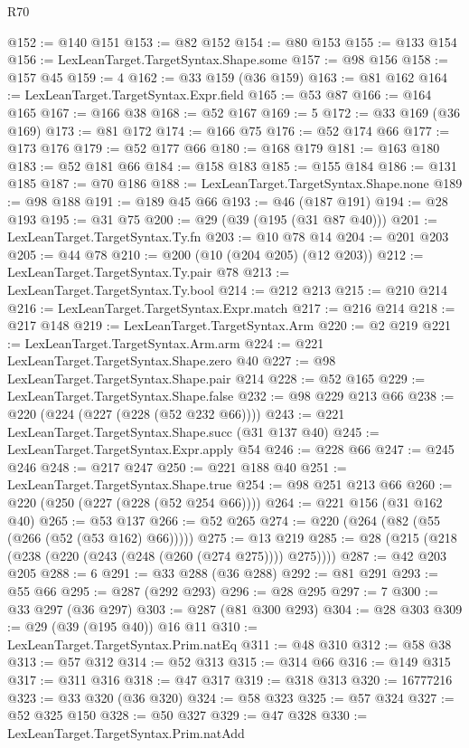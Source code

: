 \begin{lexlean}{R70}
\begin{coremodule}
@152 := @140 @151
@153 := @82 @152
@154 := @80 @153
@155 := @133 @154
@156 := LexLeanTarget.TargetSyntax.Shape.some
@157 := @98 @156
@158 := @157 @45
@159 := 4
@162 := @33 @159 (@36 @159)
@163 := @81 @162
@164 := LexLeanTarget.TargetSyntax.Expr.field
@165 := @53 @87
@166 := @164 @165
@167 := @166 @38
@168 := @52 @167
@169 := 5
@172 := @33 @169 (@36 @169)
@173 := @81 @172
@174 := @166 @75
@176 := @52 @174 @66
@177 := @173 @176
@179 := @52 @177 @66
@180 := @168 @179
@181 := @163 @180
@183 := @52 @181 @66
@184 := @158 @183
@185 := @155 @184
@186 := @131 @185
@187 := @70 @186
@188 := LexLeanTarget.TargetSyntax.Shape.none
@189 := @98 @188
@191 := @189 @45 @66
@193 := @46 (@187 @191)
@194 := @28 @193
@195 := @31 @75
@200 := @29 (@39 (@195 (@31 @87 @40)))
@201 := LexLeanTarget.TargetSyntax.Ty.fn
@203 := @10 @78 @14
@204 := @201 @203
@205 := @44 @78
@210 := @200 (@10 (@204 @205) (@12 @203))
@212 := LexLeanTarget.TargetSyntax.Ty.pair @78
@213 := LexLeanTarget.TargetSyntax.Ty.bool
@214 := @212 @213
@215 := @210 @214
@216 := LexLeanTarget.TargetSyntax.Expr.match
@217 := @216 @214
@218 := @217 @148
@219 := LexLeanTarget.TargetSyntax.Arm
@220 := @2 @219
@221 := LexLeanTarget.TargetSyntax.Arm.arm
@224 := @221 LexLeanTarget.TargetSyntax.Shape.zero @40
@227 := @98 LexLeanTarget.TargetSyntax.Shape.pair @214
@228 := @52 @165
@229 := LexLeanTarget.TargetSyntax.Shape.false
@232 := @98 @229 @213 @66
@238 := @220 (@224 (@227 (@228 (@52 @232 @66))))
@243 := @221 LexLeanTarget.TargetSyntax.Shape.succ (@31 @137 @40)
@245 := LexLeanTarget.TargetSyntax.Expr.apply @54
@246 := @228 @66
@247 := @245 @246
@248 := @217 @247
@250 := @221 @188 @40
@251 := LexLeanTarget.TargetSyntax.Shape.true
@254 := @98 @251 @213 @66
@260 := @220 (@250 (@227 (@228 (@52 @254 @66))))
@264 := @221 @156 (@31 @162 @40)
@265 := @53 @137
@266 := @52 @265
@274 := @220 (@264 (@82 (@55 (@266 (@52 (@53 @162) @66)))))
@275 := @13 @219
@285 := @28 (@215 (@218 (@238 (@220 (@243 (@248 (@260 (@274 @275)))) @275))))
@287 := @42 @203 @205
@288 := 6
@291 := @33 @288 (@36 @288)
@292 := @81 @291
@293 := @55 @66
@295 := @287 (@292 @293)
@296 := @28 @295
@297 := 7
@300 := @33 @297 (@36 @297)
@303 := @287 (@81 @300 @293)
@304 := @28 @303
@309 := @29 (@39 (@195 @40)) @16 @11
@310 := LexLeanTarget.TargetSyntax.Prim.natEq
@311 := @48 @310
@312 := @58 @38
@313 := @57 @312
@314 := @52 @313
@315 := @314 @66
@316 := @149 @315
@317 := @311 @316
@318 := @47 @317
@319 := @318 @313
@320 := 16777216
@323 := @33 @320 (@36 @320)
@324 := @58 @323
@325 := @57 @324
@327 := @52 @325 @150
@328 := @50 @327
@329 := @47 @328
@330 := LexLeanTarget.TargetSyntax.Prim.natAdd

\end{coremodule}
\end{lexlean}
